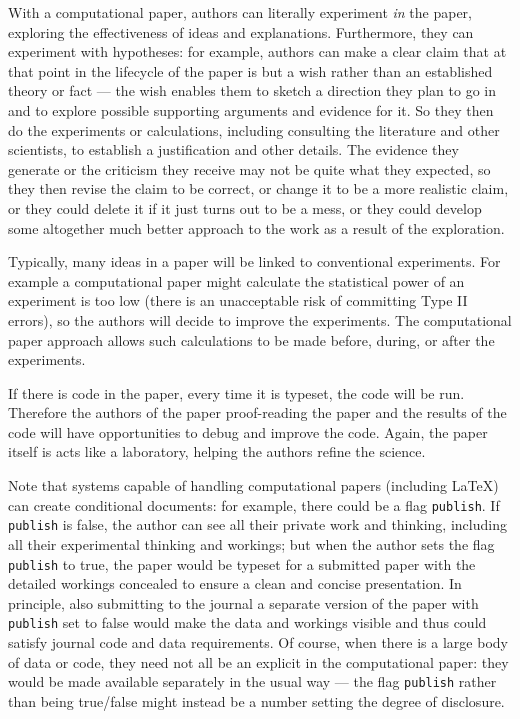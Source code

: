 \documentclass{comjnl}
\begin{document}
With a computational paper, authors can literally experiment \emph{in\/} the paper, exploring the effectiveness of ideas and explanations. Furthermore, they can experiment with hypotheses: for example, authors can make a clear claim that at that point in the lifecycle of the paper is but a wish rather than an established theory or fact --- the wish enables them to sketch a direction they plan to go in and to explore possible supporting arguments and evidence for it. So they then do the experiments or calculations, including consulting the literature and other scientists, to establish a justification and other details. The evidence they generate or the criticism they receive may not be quite what they expected, so they then revise the claim to be correct, or change it to be a more realistic claim, or they could delete it if it just turns out to be a mess, or they could develop some altogether much better approach to the work as a result of the exploration. 

Typically, many ideas in a paper will be linked to conventional experiments. For example a computational paper might calculate the statistical power of an experiment is too low (there is an unacceptable risk of committing Type II errors), so the authors will decide to improve the experiments. The computational paper approach allows such calculations to be made before, during, or after the experiments.

If there is code in the paper, every time it is typeset, the code will be run. Therefore the authors of the paper proof-reading the paper and the results of the code will have opportunities to debug and improve the code. Again, the paper itself is acts like a laboratory, helping the authors refine the science.

Note that systems capable of handling computational papers (including \LaTeX) can create conditional documents: for example, there could be a flag \texttt{publish}. If \texttt{publish} is false, the author can see all their private work and thinking, including all their experimental thinking and workings; but when the author sets the flag \texttt{publish} to true, the paper would be typeset for a submitted paper with the detailed workings concealed to ensure a clean and concise presentation. In principle, also submitting to the journal a separate version of the paper with \texttt{publish} set to false would make the data and workings visible and thus could satisfy journal code and data requirements. Of course, when there is a large body of data or code, they need not all be an explicit in the computational paper: they would be made available separately in the usual way --- the flag \texttt{publish} rather than being true/false might instead be a number setting the degree of disclosure.
\end{document}
